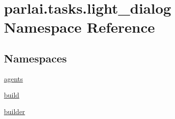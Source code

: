 \hypertarget{namespaceparlai_1_1tasks_1_1light__dialog}{}\section{parlai.\+tasks.\+light\+\_\+dialog Namespace Reference}
\label{namespaceparlai_1_1tasks_1_1light__dialog}
\subsection*{Namespaces}
\begin{DoxyCompactItemize}
\item 
 \hyperlink{namespaceparlai_1_1tasks_1_1light__dialog_1_1agents}{agents}
\item 
 \hyperlink{namespaceparlai_1_1tasks_1_1light__dialog_1_1build}{build}
\item 
 \hyperlink{namespaceparlai_1_1tasks_1_1light__dialog_1_1builder}{builder}
\end{DoxyCompactItemize}
